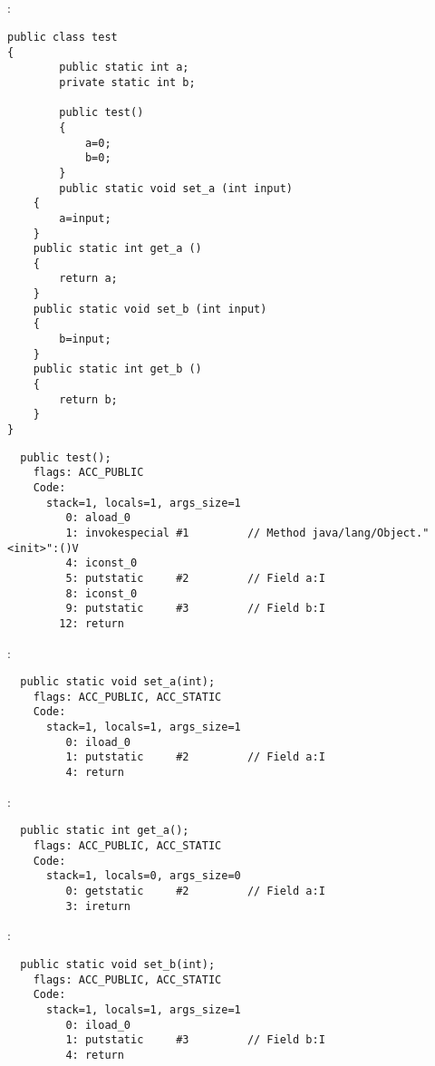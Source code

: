 \subsection{}

:

\begin{lstlisting}[caption=test.java]
public class test
{
        public static int a;
        private static int b;

        public test()
        {
            a=0;
            b=0;
        }
        public static void set_a (int input)
	{
		a=input;
	}
	public static int get_a ()
	{
		return a;
	}
	public static void set_b (int input)
	{
		b=input;
	}
	public static int get_b ()
	{
		return b;
	}
}
\end{lstlisting}


\begin{lstlisting}
  public test();
    flags: ACC_PUBLIC
    Code:
      stack=1, locals=1, args_size=1
         0: aload_0       
         1: invokespecial #1         // Method java/lang/Object."<init>":()V
         4: iconst_0      
         5: putstatic     #2         // Field a:I
         8: iconst_0      
         9: putstatic     #3         // Field b:I
        12: return        
\end{lstlisting}
        
 :

\begin{lstlisting}
  public static void set_a(int);
    flags: ACC_PUBLIC, ACC_STATIC
    Code:
      stack=1, locals=1, args_size=1
         0: iload_0       
         1: putstatic     #2         // Field a:I
         4: return        
\end{lstlisting}

 :

\begin{lstlisting}
  public static int get_a();
    flags: ACC_PUBLIC, ACC_STATIC
    Code:
      stack=1, locals=0, args_size=0
         0: getstatic     #2         // Field a:I
         3: ireturn       
\end{lstlisting}

 :

\begin{lstlisting}
  public static void set_b(int);
    flags: ACC_PUBLIC, ACC_STATIC
    Code:
      stack=1, locals=1, args_size=1
         0: iload_0       
         1: putstatic     #3         // Field b:I
         4: return        
\end{lstlisting}

